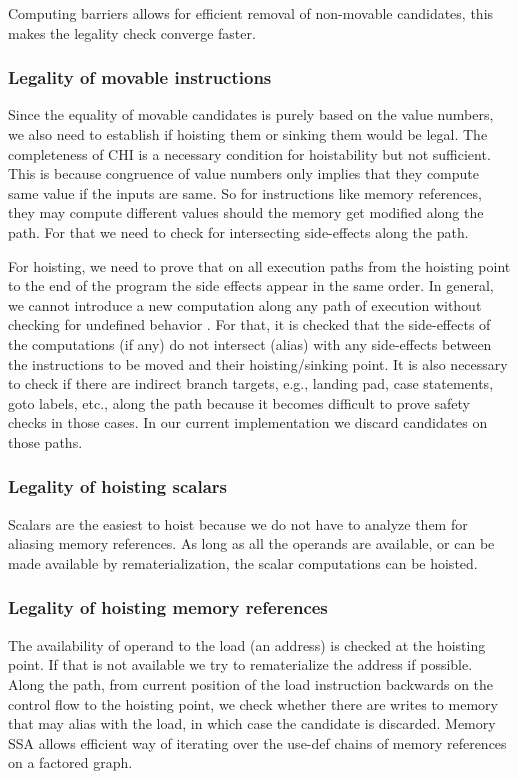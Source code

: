 \documentclass[sigplan,10pt,review,anonymous]{acmart}\settopmatter{printfolios=true,printccs=false,printacmref=false}
\begin{document}
Computing barriers allows for efficient removal of non-movable candidates, this
makes the legality check converge faster.

\subsubsection{Legality of movable instructions}
\label{subsec:legality}
Since the equality of movable candidates is purely based on the value numbers,
we also need to establish if hoisting them or sinking them would be legal. The
completeness of CHI is a necessary condition for hoistability but not
sufficient. This is because congruence of value numbers only implies that they
compute same value if the inputs are same. So for instructions like memory
references, they may compute different values should the memory get modified
along the path. For that we need to check for intersecting side-effects along
the path.

For hoisting, we need to prove that on all execution paths from the hoisting
point to the end of the program the side effects appear in the same order. In
general, we cannot introduce a new computation along any path of execution
without checking for undefined behavior \cite{undef}.  For that, it is checked
that the side-effects of the computations (if any) do not intersect (alias) with
any side-effects between the instructions to be moved and their hoisting/sinking
point. It is also necessary to check if there are indirect branch targets, e.g.,
landing pad, case statements, goto labels, etc., along the path because it
becomes difficult to prove safety checks in those cases. In our current
implementation we discard candidates on those paths.

\subsubsection{Legality of hoisting scalars}
Scalars are the easiest to hoist because we do not have to analyze them for
aliasing memory references. As long as all the operands are available, or can be
made available by rematerialization, the scalar computations can be hoisted.

\subsubsection{Legality of hoisting memory references}
The availability of operand to the load (an address) is checked at the hoisting
point. If that is not available we try to rematerialize the address if possible.
Along the path, from current position of the load instruction backwards on the
control flow to the hoisting point, we check whether there are writes to memory
that may alias with the load, in which case the candidate is discarded. Memory
SSA allows efficient way of iterating over the use-def chains of memory
references on a factored graph.
\end{document}

